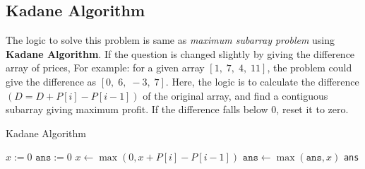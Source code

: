 \subsection{Kadane Algorithm}
The logic to solve this problem is same as \textit{maximum subarray problem} using \textbf{Kadane Algorithm}. If the question is changed slightly by giving the difference array of prices, For example: for a given array $[1,\;7,\;4,\;11]$, the problem could give the difference as $[0,\;6,\;-3,\;7]$. Here, the logic is to calculate the difference $( D = D + P[i] - P[i-1])$ of the original array, and find a contiguous subarray giving maximum profit. If the difference falls below 0, reset it to zero.
\begin{algorithm}[H]
\caption{Kadane Algorithm}
\begin{algorithmic}[1]
\State {}
\EndIf
\State $x:=0$
\State $\texttt{ans}:=0$
\State $x\gets \max(0, x + P[i] - P[i-1])$
\State $\texttt{ans}\gets \max(\texttt{ans},x)$
\EndFor
\State \Return \texttt{ans}
\EndProcedure
\end{algorithmic}
\end{algorithm}
